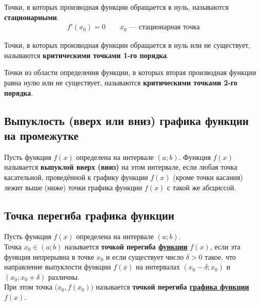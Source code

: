 \begin{definition}
	Точки, в которых производная функции обращается в нуль, называются \textbf{стационарными}.
	\begin{gather*}
		f'(x_0) = 0\qquad x_0 \text{ --- стационарная точка}
	\end{gather*}
\end{definition}

\begin{definition}
	Точки, в которых производная функции обращается в нуль или не существует, называются \textbf{критическими точками 1-го порядка}.
\end{definition}

\begin{definition}
	Точки из области определения функции, в которых вторая производная функции равна нулю или не существует, называются \textbf{критическими точками 2-го порядка}.
\end{definition}

\subsection{Выпуклость (вверх или вниз) графика функции на промежутке}

\begin{definition}
    Пусть функция $f(x)$ определена на интервале $(a;b)$. Функция $f(x)$ называется \textbf{выпуклой вверх (вниз)} на этом интервале, если любая точка касательной, проведённой к графику функции $f(x)$ (кроме точки касания) лежит выше (ниже) точки графика функции $f(x)$ с такой же абсциссой.
\end{definition}

\subsection{Точка перегиба графика функции}

\begin{definition}
    Пусть функция $f(x)$ определена на интервале $(a;b)$.\\
    Точка $x_0 \in (a;b)$ называется \textbf{точкой перегиба \underline{функции}} $f(x)$, если эта функция непрерывна в точке $x_0$ и если существует число $\delta > 0$ такое, что направление выпуклости функции $f(x)$ на интервалах $(x_0 - \delta; x_0)$ и $(x_0; x_0 + \delta)$ различны.\\
    При этом точка $\big(x_0, f(x_0)\big)$ называется \textbf{точкой перегиба \underline{графика функции}} $f(x)$.
\end{definition}





